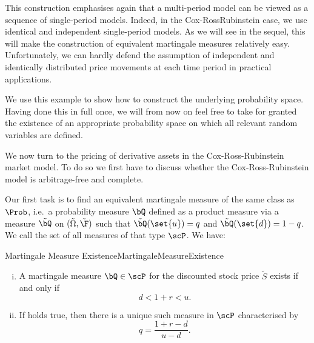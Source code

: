 This construction emphasises again that a multi-period model can be
viewed as a sequence of single-period models. Indeed, in the Cox-RossRubinstein case, we use identical and independent single-period models. As we will see in the sequel, this will make the construction of equivalent martingale measures relatively easy. Unfortunately, we can hardly defend the assumption of independent and identically distributed price movements at each time period
in practical applications.

\begin{xattention}
	We use this example to show how to construct the underlying probability space. Having done this in full once, we will from now on feel free to take for granted the existence of an appropriate probability space on which all relevant random variables are defined.
\end{xattention}

We now turn to the pricing of derivative assets in the Cox-Ross-Rubinstein market model. To do so we first have to discuss whether the Cox-Ross-Rubinstein model is arbitrage-free and complete.

Our first task is to find an equivalent martingale measure of the same class as \(\Prob\), i.e.\ a probability measure \(\bQ\) defined as a product measure via a measure \(\tilde{\bQ}\) on \((\tilde{\Omega}, \tilde{\F})\) such that \(\tilde{\bQ}(\set{u}) = q\) and \(\tilde{\bQ}(\set{d}) = 1-q\). We call the set of all measures of that type \(\scP\). We have:

\begin{prop}{Martingale Measure Existence}{MartingaleMeasureExistence}
	\begin{enumerate}[(i)]
		\item A martingale measure \(\bQ \in \scP\) for the discounted stock price \(\tilde{S}\) exists if and only if
		      \begin{equation}
			      d < 1+r < u.
			      \label{eq:CRRNoArb}
		      \end{equation}
		\item If  holds true, then there is a unique such measure in \(\scP\) characterised by
		      \begin{equation}
			      q = \frac{1+r-d}{u-d}.
		      \end{equation}
	\end{enumerate}
\end{prop}

